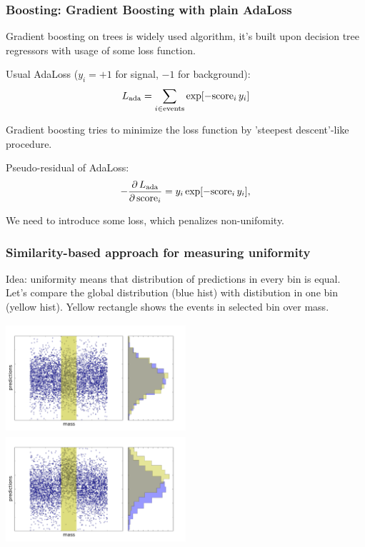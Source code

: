 \documentclass{beamer}
\begin{document}
\begin{frame}[t]
    \frametitle{Boosting: Gradient Boosting with plain AdaLoss}
    Gradient boosting on trees is widely used algorithm, 
    it's built upon decision tree regressors with usage of some loss function. 

    Usual AdaLoss ($y_i = +1$ for signal, $-1$ for background):
    \[
        L_\text{ada} = \sum_{i \in \text{events}} \exp [- \text{score}_i \, y_i] 
    \]

    Gradient boosting tries to minimize the loss function by 'steepest descent'-like procedure.

    Pseudo-residual of AdaLoss:
    \[
        -\dfrac{\partial \, L_\text{ada}}{\partial \, \text{score}_i} = y_i \exp[- \text{score}_i \, y_i],
    \]

    We need to introduce some loss, which penalizes non-unifomity.

\end{frame}

\begin{frame}
    \frametitle{Similarity-based approach for measuring uniformity}
    Idea: uniformity means that distribution of predictions in every bin is equal. 
    \bigskip \\ 
    {\small
  	Let's compare the global distribution (blue hist) 
  	with distibution in one bin (yellow hist).
  	Yellow rectangle shows the events in selected bin over mass.
  	}

    \includegraphics[width=0.5\textwidth, height=4cm]{img/uniform_hist.pdf}
    \includegraphics[width=0.5\textwidth, height=4cm]{img/nonuniform_hist.pdf}    

\end{frame}
\end{document}
